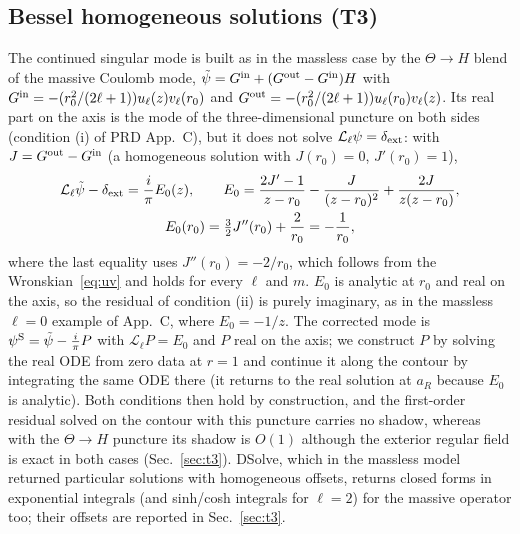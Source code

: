 \documentclass[11pt,a4paper]{article}
\newcommand{\dext}{\delta_{\rm ext}}
\newcommand{\Lop}{\mathcal{L}_\ell}
\begin{document}
\subsection{Bessel homogeneous solutions (T3)}\label{sec:bessel}
The continued singular mode is built as in the massless case by the $\Theta\to H$ blend of the massive Coulomb mode, $\tilde\psi=G^{\rm in}+(G^{\rm out}-G^{\rm in})H$ with $G^{\rm in}=-(r_0^2/(2\ell+1))u_\ell(z)v_\ell(r_0)$ and $G^{\rm out}=-(r_0^2/(2\ell+1))u_\ell(r_0)v_\ell(z)$.
Its real part on the axis is the mode of the three-dimensional puncture on both sides (condition (i) of PRD App.~C), but it does not solve $\Lop\psi=\dext$: with $J=G^{\rm out}-G^{\rm in}$ (a homogeneous solution with $J(r_0)=0$, $J'(r_0)=1$),
\begin{gather}
\Lop\tilde\psi-\dext=\frac i\pi E_0(z),\qquad
E_0=\frac{2J'-1}{z-r_0}-\frac{J}{(z-r_0)^2}+\frac{2J}{z(z-r_0)},\nonumber\\
E_0(r_0)=\tfrac32J''(r_0)+\frac2{r_0}=-\frac1{r_0},
\label{eq:E0}
\end{gather}
where the last equality uses $J''(r_0)=-2/r_0$, which follows from the Wronskian~\eqref{eq:uv} and holds for every $\ell$ and $m$.
$E_0$ is analytic at $r_0$ and real on the axis, so the residual of condition (ii) is purely imaginary, as in the massless $\ell=0$ example of App.~C, where $E_0=-1/z$.
The corrected mode is $\psi^{\rm S}=\tilde\psi-\tfrac i\pi P$ with $\Lop P=E_0$ and $P$ real on the axis; we construct $P$ by solving the real ODE from zero data at $r=1$ and continue it along the contour by integrating the same ODE there (it returns to the real solution at $a_R$ because $E_0$ is analytic).
Both conditions then hold by construction, and the first-order residual solved on the contour with this puncture carries no shadow, whereas with the $\Theta\to H$ puncture its shadow is $O(1)$ although the exterior regular field is exact in both cases (Sec.~\ref{sec:t3}).
DSolve, which in the massless model returned particular solutions with homogeneous offsets, returns closed forms in exponential integrals (and sinh/cosh integrals for $\ell=2$) for the massive operator too; their offsets are reported in Sec.~\ref{sec:t3}.
\end{document}
